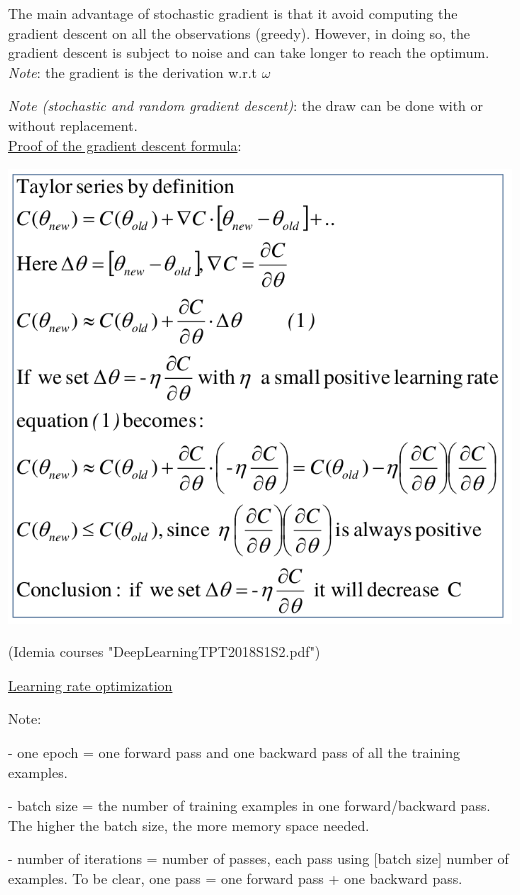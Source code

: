 The main advantage of stochastic gradient is that it avoid computing the gradient descent on all the observations (greedy). However, in doing so, the gradient descent is subject to noise and can take longer to reach the optimum. \\

\textit{Note}: the gradient is the derivation w.r.t $\omega$

\textit{Note (stochastic and random gradient descent)}: the draw can be done with or without replacement. \\



\underline{Proof of the gradient descent formula}:

\includegraphics[scale=0.3]{../images/GradientDescent_proof.png}

(Idemia courses "DeepLearningTPT2018S1S2.pdf")

\vspace{5mm}
\underline{Learning rate optimization}
\vspace{5mm}

Note:

- one epoch = one forward pass and one backward pass of all the training examples.

- batch size = the number of training examples in one forward/backward pass. The higher the batch size, the more memory space needed.

- number of iterations = number of passes, each pass using [batch size] number of examples. To be clear, one pass = one forward pass + one backward pass.

